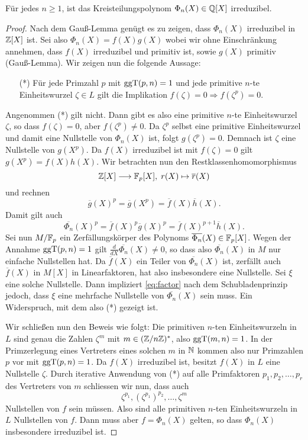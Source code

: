 \documentclass{book}
\begin{document}
\begin{thm}
Für jedes $n \ge 1$, ist das Kreisteilungspolynom $\Phi_n(X) \in \mathbb{Q}[X]$ irreduzibel. 
\end{thm}
\begin{proof}
	Nach dem Gauß-Lemma genügt es zu zeigen, dass $\Phi_n(X)$ irreduzibel in $\mathbb{Z}[X]$ ist. Sei
	also $\Phi_n(X) = f(X) g(X)$ wobei wir ohne Einschränkung annehmen, dass $f(X)$ irreduzibel
	und primitiv ist, sowie $g(X)$ primitiv (Gauß-Lemma). Wir zeigen nun die folgende Aussage:
	\begin{itemize}
		\item[(*)] Für jede Primzahl $p$ mit $\operatorname{ggT}(p,n) =1$ und jede primitive $n$-te
			Einheitswurzel $\zeta \in L$ gilt die Implikation $f(\zeta) = 0 \Rightarrow
			f(\zeta^p) = 0$. 
	\end{itemize}
	Angenommen (*) gilt nicht. Dann gibt es also eine primitive $n$-te Einheitswurzel $\zeta$,
	so dass $f(\zeta) = 0$, aber $f(\zeta^p) \ne 0$. Da $\zeta^p$ selbst eine primitive
	Einheitswurzel und damit eine Nullstelle von $\Phi_n(X)$ ist, folgt $g(\zeta^p) = 0$.
	Demnach ist $\zeta$ eine Nullstelle von $g(X^p)$. Da $f(X)$ irreduzibel ist mit $f(\zeta) =
	0$ gilt $g(X^p) = f(X)h(X)$. Wir betrachten nun den Restklassenhomomorphismus
	\[
		\mathbb{Z}[X] \longrightarrow \mathbb{F}_p[X],\; r(X) \mapsto \overline{r}(X)
	\]
	und rechnen
	\[
		\overline{g}(X)^p = \overline{g}(X^p) = \overline{f}(X)\overline{h}(X).
	\]
	Damit gilt auch 
	\begin{equation}\label{eq:factor}
			\overline{\Phi_n}(X)^p = \overline{f}(X)^p\overline{g}(X)^p =
			\overline{f}(X)^{p+1}\overline{h}(X).
	\end{equation}
	Sei nun $M/\mathbb{F}_p$ ein Zerfällungskörper des Polynoms $\overline{\Phi_n}(X) \in \mathbb{F}_p[X]$.
	Wegen der Annahme $\operatorname{ggT}(p,n) = 1$ gilt $\frac{d}{dX}\overline{\Phi_n}(X) \ne 0$, so dass also
	$\overline{\Phi_n}(X)$ in $M$ nur einfache Nullstellen hat. Da $\overline{f}(X)$ ein Teiler
	von $\overline{\Phi_n}(X)$ ist, zerfällt auch $\overline{f}(X)$ in $M[X]$ in Linearfaktoren,
	hat also insbesondere eine Nullstelle. Sei $\xi$ eine solche Nullstelle. Dann impliziert
	\eqref{eq:factor} nach dem Schubladenprinzip jedoch, dass $\xi$ eine mehrfache Nullstelle von
	$\overline{\Phi_n}(X)$ sein muss. Ein Widerspruch, mit dem also (*) gezeigt ist. 

	Wir schließen nun den Beweis wie folgt: Die primitiven $n$-ten Einheitswurzeln in $L$ sind
	genau die Zahlen $\zeta^m$ mit $m \in (\mathbb{Z}/n\mathbb{Z} )^*$, also $\operatorname{ggT}(m,n) = 1$. In der
	Primzerlegung eines Vertreters eines solchen $m$ in $\mathbb{N}$ kommen also nur Primzahlen $p$ vor
	mit $\operatorname{ggT}(p,n) = 1$. Da $f(X)$ irreduzibel ist, besitzt $f(X)$ in $L$ eine Nullstelle
	$\zeta$. Durch iterative Anwendung von (*) auf alle Primfaktoren $p_1, p_2, \dots, p_r$ des Vertreters von $m$
	schliessen wir nun, dass auch 
	\[
		\zeta^{p_1}, (\zeta^{p_1})^{p_2}, \dots ,\zeta^m 
	\]
	Nullstellen von $f$ sein müssen. Also sind alle primitiven $n$-ten Einheitswurzeln in $L$
	Null\-stellen von
	$f$. Dann muss aber $f = \Phi_n(X)$ gelten, so dass $\Phi_n(X)$ insbesondere irreduzibel
	ist.  
\end{proof}
\end{document}
